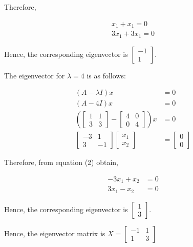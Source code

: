 \documentclass{article}
\begin{document}
Therefore,

$$
\begin{array}{r}
x_{1}+x_{1}=0 \\
3 x_{1}+3 x_{1}=0
\end{array}
$$

Hence, the corresponding eigenvector is $\left[\begin{array}{c}-1 \\ 1\end{array}\right]$.

The eigenvector for $\lambda=4$ is as follows:

$$
\begin{aligned}
(A-\lambda I) x & =0 \\
(A-4 I) x & =0 \\
\left(\left[\begin{array}{ll}
1 & 1 \\
3 & 3
\end{array}\right]-\left[\begin{array}{ll}
4 & 0 \\
0 & 4
\end{array}\right]\right) x & =0 \\
{\left[\begin{array}{cc}
-3 & 1 \\
3 & -1
\end{array}\right]\left[\begin{array}{l}
x_{1} \\
x_{2}
\end{array}\right] } & =\left[\begin{array}{l}
0 \\
0
\end{array}\right]
\end{aligned}
$$

Therefore, from equation (2) obtain,

$$
\begin{aligned}
-3 x_{1}+x_{2} & =0 \\
3 x_{1}-x_{2} & =0
\end{aligned}
$$

Hence, the corresponding eigenvector is $\left[\begin{array}{l}1 \\ 3\end{array}\right]$.

Hence, the eigenvector matrix is $X=\left[\begin{array}{cc}-1 & 1 \\ 1 & 3\end{array}\right]$
\end{document}
